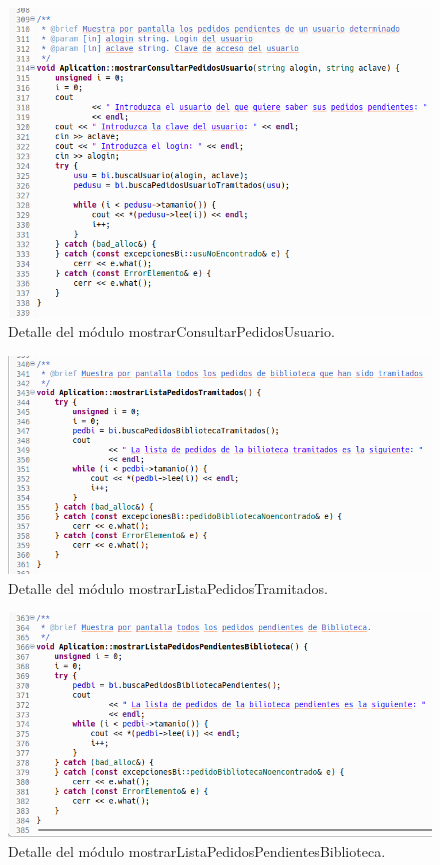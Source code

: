 			\begin{figure}[H]
				\centering
				\includegraphics[scale=0.5]{img/captura105.png}
				\caption{Detalle del módulo mostrarConsultarPedidosUsuario.}
				\label{captura105}
			\end{figure}
		
			\begin{figure}[H]
				\centering
				\includegraphics[scale=0.5]{img/captura106.png}
				\caption{Detalle del módulo mostrarListaPedidosTramitados.}
				\label{captura106}
			\end{figure}
		
			\begin{figure}[H]
				\centering
				\includegraphics[scale=0.5]{img/captura107.png}
				\caption{Detalle del módulo mostrarListaPedidosPendientesBiblioteca.}
				\label{captura107}
			\end{figure}
		
